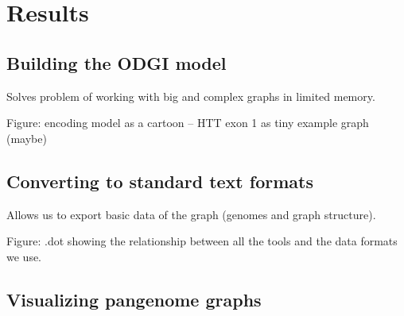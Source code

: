 \documentclass{bioinfo}
\begin{document}
\begin{comment}
key message of the paper is that we have collected a set of algorithms that enable easy use of pangenome graphs for investigating biology
-> build model solves problem of working with big graphs in memory
-> view (convert to GFA) & paths solve problem of exporting basic features of the graph (e.g. paths)
-> stats (understand basic size / structure) & bin & degree & depth solves problem of understanding the overall structure and size of the graph
-> sort (groom) & layout solves problem of finding latent structure in the pangenome
-> viz & draw provides a human-viewable readout of the graph
-> chop & unchop & squeeze & break & prune & explode lets us break apart or combine the graph nodes and topology
-> position & tips & untangle (jaccard based coordinate conversion) provides a way to map coordinates between any genomes in the graph (e.g. liftover!)
-> extract lets us pull out specific regions of the graph based on path ranges, nodes and positions
\end{comment}

\section{Results}

\subsection{Building the \textsc{ODGI} model}


Solves problem of working with big and complex graphs in limited memory.

Figure: encoding model as a cartoon --  HTT exon 1 as tiny example graph (maybe)

\subsection{Converting to standard text formats}


Allows us to export basic data of the graph (genomes and graph structure).

Figure: .dot showing the relationship between all the tools and the data formats we use.

\subsection{Visualizing pangenome graphs}
\end{document}
